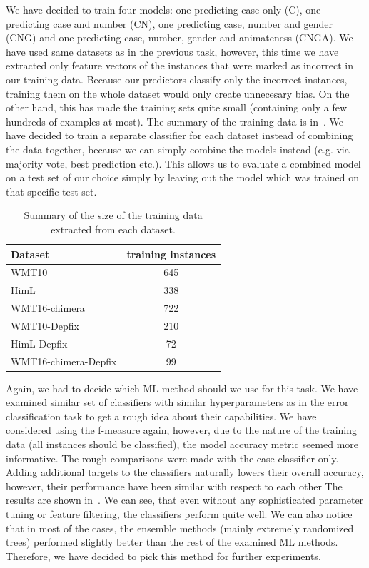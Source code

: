 We have decided to train four models: one predicting case only (C), one predicting case and number (CN),
 one predicting case, number and gender (CNG) and one predicting case, number, gender and animateness (CNGA).
We have used same datasets as in the previous task, however, this
time we have extracted only feature vectors of the instances that were marked as incorrect in our training data. Because
our predictors classify only the incorrect instances, training them on the whole dataset would only create
unnecesary bias. On the other hand, this has made the training sets quite small (containing only a few hundreds of examples
at most). The summary of the training data is in~. We have decided to train a separate classifier
for each dataset instead of combining the data together, because we can simply combine the models instead (e.g. via majority
vote, best prediction etc.). This allows us to evaluate a combined model on a test set of our choice simply by leaving
out the model which was trained on that specific test set.

\begin{table}[t]
\centering
\small

\begin{tabular}{lc}
Dataset  &  \hash{} training instances  \\
\hline
WMT10  &  645  \\
HimL  & 338  \\
WMT16-chimera  &  722  \\
WMT10-Depfix  &  210  \\
HimL-Depfix  &  72  \\
WMT16-chimera-Depfix  &  99  \\
\end{tabular}
\caption{
    Summary of the size of the training data extracted from each dataset.
}
\label{cats-training-sum}
\end{table}

Again, we had to decide which ML method should we use for this task. 
We have examined similar set of classifiers with similar
hyperparameters as in the error classification task to get a rough idea about their capabilities.
We have considered using the f-measure again, however, due to the nature of the training data (all
instances should be classified), the model accuracy metric seemed more informative.
The rough comparisons were made with the case classifier only.
Adding additional targets to the classifiers naturally lowers their overall accuracy,
however, their performance have been similar with respect to each other
The results are shown in~. We can see, that even without any sophisticated parameter
tuning or feature filtering, the classifiers perform quite well. We can also notice that in most of the cases, the ensemble
methods (mainly extremely randomized trees) performed slightly better than the rest of the examined ML methods. Therefore, we have decided
to pick this method for further experiments.

